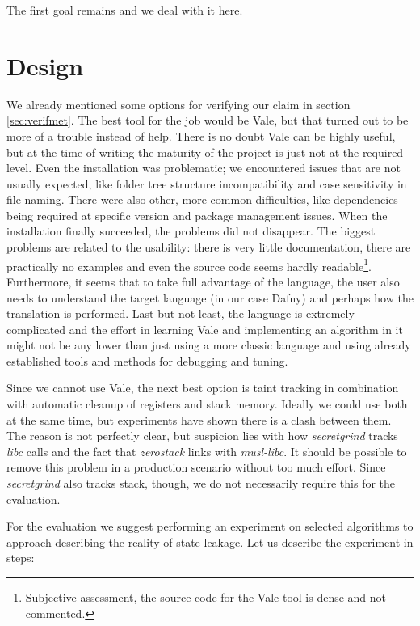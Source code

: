 \documentclass[a4paper,10pt,openright]{memoir}
\newcommand{\term}[1]{\textit{#1}}
\begin{document}
The first goal remains and we deal with it here.

\section{Design}

We already mentioned some options for verifying our claim in section 
\ref{sec:verifmet}. The best tool for the job would be Vale, but that 
turned out to be more of a trouble instead of help. There is no doubt 
Vale can be highly useful, but at the time of writing the maturity of 
the project is just not at the required level. Even the installation 
was problematic; we encountered issues that are not usually expected, 
like folder tree structure incompatibility and case sensitivity in file 
naming. There were also other, more common difficulties, like 
dependencies being required at specific version and package management 
issues. When the installation finally succeeded, the problems did not 
disappear. The biggest problems are related to the usability: there is 
very little documentation, there are practically no examples and even 
the source code seems hardly readable\footnote{Subjective assessment, 
the source code for the Vale tool is dense and not commented.}. 
Furthermore, it seems that to take full advantage of the language, the 
user also needs to understand the target language (in our case Dafny) 
and perhaps how the translation is performed. Last but not least, the 
language is extremely complicated and the effort in learning Vale and 
implementing an algorithm in it might not be any lower than just using 
a more classic language and using already established tools and methods 
for debugging and tuning.

Since we cannot use Vale, the next best option is taint tracking in 
combination with automatic cleanup of registers and stack memory. 
Ideally we could use both at the same time, but experiments have shown 
there is a clash between them. The reason is not perfectly clear, but 
suspicion lies with how \term{secretgrind} tracks \term{libc} calls and 
the fact that \term{zerostack} links with \term{musl-libc}. It should 
be possible to remove this problem in a production scenario without too 
much effort. Since \term{secretgrind} also tracks stack, though, we do 
not necessarily require this for the evaluation.

For the evaluation we suggest performing an experiment on selected 
algorithms to approach describing the reality of state leakage. Let us 
describe the experiment in steps:
\end{document}
